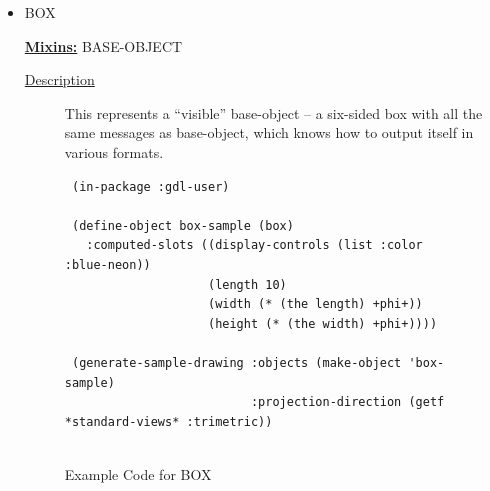 \documentclass [11pt]{book}
\begin{document}
\begin{itemize}
\begin{description}
\end{description}







\item {}BOX


\textbf{
\underline{Mixins:}} BASE-OBJECT





\begin{description}

\item [
\underline{Description}]


This represents a ``visible'' base-object -- a six-sided box with all the same
messages as base-object, which knows how to output itself in various formats.



\end{description}




\begin{figure}
\begin{lrbox}{\boxedverb}
\begin{minipage}{\linewidth}
{\small

\begin{verbatim}
 (in-package :gdl-user)

 (define-object box-sample (box)
   :computed-slots ((display-controls (list :color :blue-neon))
                    (length 10)
                    (width (* (the length) +phi+))
                    (height (* (the width) +phi+))))

 (generate-sample-drawing :objects (make-object 'box-sample)
                          :projection-direction (getf *standard-views* :trimetric))


\end{verbatim}}
\end{minipage}
\end{lrbox}
\fbox{\usebox{\boxedverb}}

\caption{Example Code for BOX}

\label{fig:example-code-BOX}

\end{figure}


\end{itemize}
\end{document}
